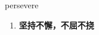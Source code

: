 
\begin{frame}
{\huge persevere}
\begin{center}
\begin{enumerate}\Large
  \item \textbf{坚持不懈，不屈不挠}
\end{enumerate}
\end{center}
\end{frame}
